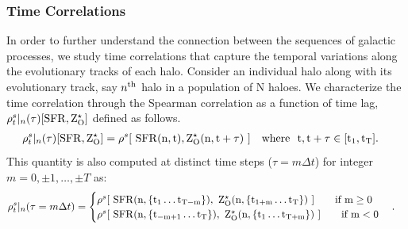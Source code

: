 \subsubsection{Time Correlations}
\label{sec:time-correl-sfrZ}
In order to further understand the connection between the sequences of galactic processes, we study time correlations that capture the temporal variations along the evolutionary tracks of each halo.
Consider an individual halo along with its evolutionary track, say $n^{\rm{th}}$ halo in a population of N haloes. We characterize the time correlation through the Spearman correlation as a function of time lag, $\rho^s_t |_{n}(\tau)[\rm{SFR}, Z^{\star}_{\rm{O}}]$ defined as follows.
\begin{align}
\rho^s_t |_{n}(\tau)[\rm{SFR}, Z^{\star}_{\rm{O}}] &= \rho^s [ ~\rm{SFR}(n,t), Z^{\star}_{\rm{O}}(n,t+\tau) ~] \quad \text{where } ~t, t+\tau \in [t_1,t_T].
\end{align}
This quantity is also computed at distinct time steps ($\tau = m \Delta t$) for integer $m=0, \pm1, \ldots, \pm T$ as:
\begin{align}
\label{eq:def-time-correl-nth-halo}
\rho^s_t |_{n}(\tau = m \Delta t) &= 
\begin{cases}
\rho^s [ ~\rm{SFR}(n,\{t_1 \ldots t_{T-m}\}), ~Z^{\star}_{\rm{O}}(n,\{t_{1+m} \ldots t_T\}) ~]  \qquad \text{if } m \geq 0 \\
\rho^s [ ~\rm{SFR}(n,\{t_{-m+1} \ldots t_T\}), ~Z^{\star}_{\rm{O}}(n,\{t_1 \ldots t_{T+m}\}) ~] \qquad \text{if } m < 0
\end{cases}.
\end{align}

